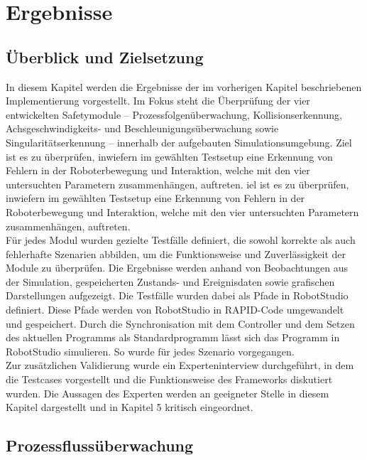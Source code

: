 \chapter{Ergebnisse}
\label{sec:ergebnisse}

\section{Überblick und Zielsetzung}

In diesem Kapitel werden die Ergebnisse der im vorherigen Kapitel beschriebenen
Implementierung vorgestellt. Im Fokus steht die Überprüfung der vier
entwickelten Safetymodule – Prozessfolgenüberwachung, Kollisionserkennung,
Achsgeschwindigkeits- und Beschleunigungsüberwachung sowie
Singularitätserkennung – innerhalb der aufgebauten Simulationsumgebung. Ziel ist
es zu überprüfen, inwiefern im gewählten Testsetup eine Erkennung von Fehlern in
der Roboterbewegung und Interaktion, welche mit den vier untersuchten Parametern
zusammenhängen, auftreten. iel ist es zu überprüfen, inwiefern im gewählten
Testsetup eine Erkennung von Fehlern in der Roboterbewegung und Interaktion,
welche mit den vier untersuchten Parametern zusammenhängen, auftreten.\\

\noindent
Für jedes Modul wurden gezielte Testfälle definiert, die sowohl korrekte als
auch fehlerhafte Szenarien abbilden, um die Funktionsweise und Zuverlässigkeit
der Module zu überprüfen. Die Ergebnisse werden anhand von Beobachtungen aus der
Simulation, gespeicherten Zustands- und Ereignisdaten sowie grafischen
Darstellungen aufgezeigt. Die Testfälle wurden dabei als Pfade in RobotStudio
definiert. Diese Pfade werden von RobotStudio in RAPID-Code umgewandelt und
gespeichert. Durch die Synchronisation mit dem Controller und dem Setzen des
aktuellen Programms als Standardprogramm lässt sich das Programm in RobotStudio
simulieren. So wurde für jedes Szenario vorgegangen.\\

\noindent
Zur zusätzlichen Validierung wurde ein Experteninterview durchgeführt, in dem
die Testcases vorgestellt und die Funktionsweise des Frameworks diskutiert
wurden. Die Aussagen des Experten werden an geeigneter Stelle in diesem Kapitel
dargestellt und in Kapitel 5 kritisch eingeordnet.
\newpage
\section{Prozessflussüberwachung}
\label{sec:processauswertung}

